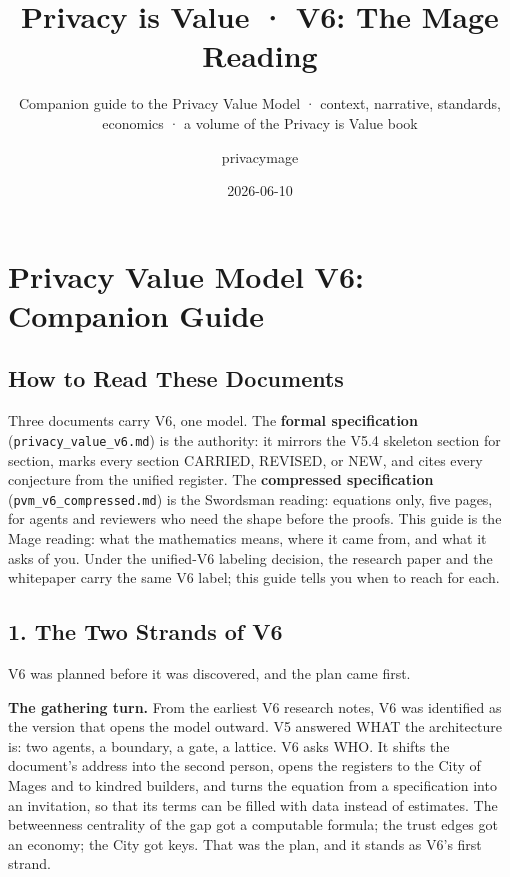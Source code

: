\documentclass[
]{article}
\title{Privacy is Value · V6: The Mage Reading}
\subtitle{Companion guide to the Privacy Value Model · context,
narrative, standards, economics · a volume of the Privacy is Value book}
\author{privacymage}
\date{2026-06-10}
\begin{document}
\maketitle

\section{Privacy Value Model V6: Companion
Guide}\label{privacy-value-model-v6-companion-guide}

\subsection{How to Read These
Documents}\label{how-to-read-these-documents}

Three documents carry V6, one model. The \textbf{formal specification}
(\texttt{privacy\_value\_v6.md}) is the authority: it mirrors the V5.4
skeleton section for section, marks every section CARRIED, REVISED, or
NEW, and cites every conjecture from the unified register. The
\textbf{compressed specification} (\texttt{pvm\_v6\_compressed.md}) is
the Swordsman reading: equations only, five pages, for agents and
reviewers who need the shape before the proofs. This guide is the Mage
reading: what the mathematics means, where it came from, and what it
asks of you. Under the unified-V6 labeling decision, the research paper
and the whitepaper carry the same V6 label; this guide tells you when to
reach for each.

\subsection{1. The Two Strands of V6}\label{the-two-strands-of-v6}

V6 was planned before it was discovered, and the plan came first.

\textbf{The gathering turn.} From the earliest V6 research notes, V6 was
identified as the version that opens the model outward. V5 answered WHAT
the architecture is: two agents, a boundary, a gate, a lattice. V6 asks
WHO. It shifts the document's address into the second person, opens the
registers to the City of Mages and to kindred builders, and turns the
equation from a specification into an invitation, so that its terms can
be filled with data instead of estimates. The betweenness centrality of
the gap got a computable formula; the trust edges got an economy; the
City got keys. That was the plan, and it stands as V6's first strand.
\end{document}
